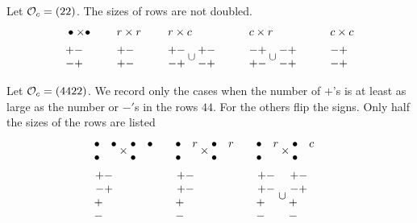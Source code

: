 \documentclass[11pt ,reqno]{amsart}
\begin{document}
\begin{example}
  Let $\CO_c=(2{2})$.  The sizes of rows are not doubled.
  $$
  \begin{aligned}
 &\bullet\times\bullet &&{r}\times {r}&&{r}\times
 {c}&&{c}\times {r}&&c\times {c}\\
 &\mat +-\\-+\emat\qquad &&\mat +-\\+-\emat\qquad&&\mat +-\\-+\emat\cup\mat
 +-\\-+\emat\qquad&&\mat-+\\+-\emat\cup\mat-+\\-+\emat\qquad&&\mat -+\\-+\emat 
  \end{aligned}
  $$
\end{example}
\begin{example}
Let $\CO_c=(442{2})$. We record only the cases when the number of
$+$'s is at least as large as the number or $-'$s in the rows $44.$
For the others flip the signs. Only half the sizes of the rows are listed
$$
\begin{aligned}
&\mat\bullet&\bullet\\\bullet\emat\times\mat\bullet&\bullet\\\bullet\emat\quad
&&\mat\bullet&r\\\bullet\emat\times\mat\bullet&r\\\bullet\emat\quad
&&\mat\bullet&r\\\bullet\emat\times\mat\bullet&c\\\bullet\emat\quad\\
&\mat +-\\-+\\+\quad\\-\quad\emat
&&\mat +-\\+-\\+\quad\\-\quad\emat
&&\mat +-\\+-\\+\quad\\-\quad\emat\cup\mat +-\\-+\\+\quad\\-\quad\emat

\end{aligned}$$
\end{example}
\end{document}
